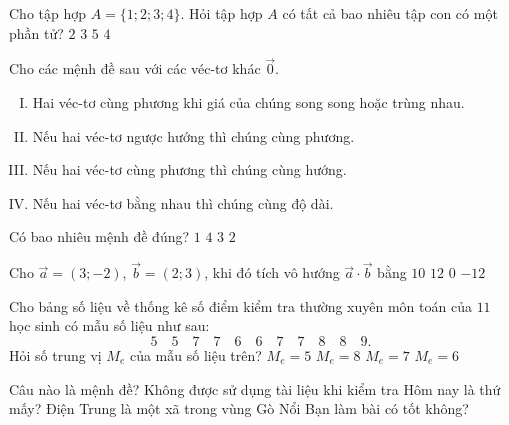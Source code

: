 \begin{ex}%
Cho tập hợp $A=\{1;2;3;4\}$. Hỏi tập hợp $A$ có tất cả bao nhiêu tập con có một phần tử?
\choice
{$2$}
{$3$}
{$5$}
{\True $4$}
\end{ex}

\begin{ex}%
Cho các mệnh đề sau với các véc-tơ khác $\vec{0}$.
\begin{enumerate}[(I).]
	\item Hai véc-tơ cùng phương khi giá của chúng song song hoặc trùng nhau.
	\item Nếu hai véc-tơ ngược hướng thì chúng cùng phương.
	\item Nếu hai véc-tơ cùng phương thì chúng cùng hướng.
	\item Nếu hai véc-tơ bằng nhau thì chúng cùng độ dài.
\end{enumerate}
Có bao nhiêu mệnh đề đúng?
\choice
{$1$}
{$4$}
{\True $3$}
{$2$}
\end{ex}

\begin{ex}%
Cho $\vec{a}=(3;-2)$, $\vec{b}=(2;3)$, khi đó tích vô hướng $\vec{a}\cdot\vec{b}$ bằng
\choice
{$10$}
{$12$}
{\True $0$}
{$-12$}
\end{ex}

\begin{ex}%
Cho bảng số liệu về thống kê số điểm kiểm tra thường xuyên môn toán của $11$ học sinh có mẫu số liệu như sau:
\[5\quad 5\quad 7\quad 7\quad 6\quad 6\quad 7\quad 7\quad 8\quad 8\quad 9. \]
Hỏi số trung vị $M_e$ của mẫu số liệu trên?
\choice
{$M_e=5$}
{$M_e=8$}
{\True $M_e=7$}
{$M_e=6$}
\end{ex}

\begin{ex}%
Câu nào là mệnh đề?
\choice
{Không được sử dụng tài liệu khi kiểm tra}
{Hôm nay là thứ mấy?}
{\True Điện Trung là một xã trong vùng Gò Nổi}
{Bạn làm bài có tốt không?}
\end{ex}

